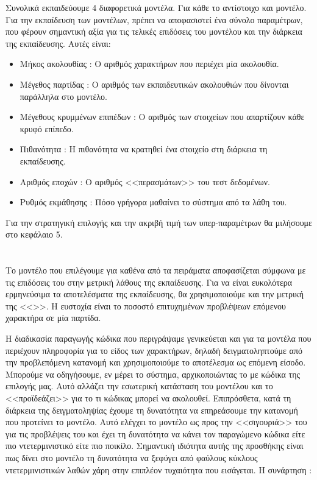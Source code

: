Συνολικά εκπαιδεύουμε 4 διαφορετικά μοντέλα. Για κάθε  το αντίστοιχο  και  μοντέλο.
Για την εκπαίδευση των μοντέλων, πρέπει να αποφασιστεί ένα σύνολο παραμέτρων, που φέρουν σημαντική αξία για τις τελικές επιδόσεις του μοντέλου και την διάρκεια της εκπαίδευσης. Αυτές είναι:

\begin{itemize} 
\item Μήκος ακολουθίας : Ο αριθμός χαρακτήρων που περιέχει μία ακολουθία.
\item Μέγεθος παρτίδας : Ο αριθμός των εκπαιδευτικών ακολουθιών που δίνονται παράλληλα στο μοντέλο.
\item Μέγεθους κρυμμένων επιπέδων : Ο αριθμός των στοιχείων  που απαρτίζουν κάθε κρυφό επίπεδο.
\item Πιθανότητα : Η πιθανότητα να κρατηθεί ένα στοιχείο στη διάρκεια τη εκπαίδευσης.
\item Αριθμός εποχών : Ο αριθμός <<περασμάτων>> του τεστ δεδομένων.
\item Ρυθμός εκμάθησης : Πόσο γρήγορα μαθαίνει το σύστημα από τα λάθη του.

\end{itemize}

Για την στρατηγική επιλογής και την ακριβή τιμή των υπερ-παραμέτρων θα μιλήσουμε στο κεφάλαιο 5.

\section{}

Το μοντέλο που επιλέγουμε για καθένα από τα πειράματα αποφασίζεται σύμφωνα με τις επιδόσεις του στην μετρική λάθους της εκπαίδευσης.
Για να είναι ευκολότερα ερμηνεύσιμα τα αποτελέσματα της εκπαίδευσης, θα χρησιμοποιούμε και την μετρική της <<>>.
Η ευστοχία είναι το ποσοστό επιτυχημένων προβλέψεων επόμενου χαρακτήρα σε μία παρτίδα.

Η διαδικασία παραγωγής κώδικα που περιγράψαμε γενικεύεται και για τα μοντέλα που περιέχουν πληροφορία για το είδος των χαρακτήρων, δηλαδή δειγματοληπτούμε από την προβλεπόμενη κατανομή και χρησιμοποιούμε το αποτέλεσμα ως επόμενη είσοδο.
Μπορούμε να οδηγήσουμε, εν μέρει το σύστημα, αρχικοποιώντας το με κώδικα της επιλογής μας. Αυτό αλλάζει την εσωτερική κατάσταση του μοντέλου και το <<προϊδεάζει>> για το τι κώδικας μπορεί να ακολουθεί. 
Επιπρόσθετα, κατά τη διάρκεια της δειγματοληψίας έχουμε τη δυνατότητα να επηρεάσουμε την κατανομή που προτείνει το μοντέλο.
Αυτό ελέγχει το μοντέλο ως προς την <<σιγουριά>> του για τις προβλέψεις του και έχει τη δυνατότητα να κάνει τον παραγώμενο κώδικα είτε πιο ντετερμινιστικό είτε πιο ποικίλο.
Σημαντική ιδιότητα αυτής της προσθήκης είναι πως δίνει στο μοντέλο τη δυνατότητα να ξεφύγει από φαύλους κύκλους ντετερμινιστικών λαθών χάρη στην επιπλέον τυχαιότητα που εισάγεται.
Η συνάρτηση : 

